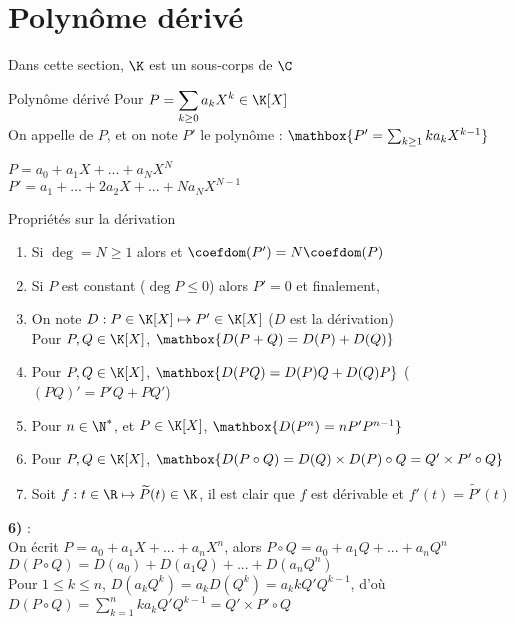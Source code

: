 \documentclass[12pt,a4paper]{report}
\begin{document}
\section{Polynôme dérivé}
Dans cette section, $\K$ est un sous-corps de $\C$

\begin{definition}{Polynôme dérivé}{}
Pour $P = \displaystyle\sum_{k\geq 0} a_k X^k \in \K[X]$\\
On appelle  de $P$, et on note $P'$ le polynôme : $\mathbox{P' = \sum_{k\geq 1} k a_k X^{k-1} }$
\end{definition}

\begin{exemple}
$P=a_0 + a_1 X + ... + a_N X^N$\\
$P'= a_1 + ... + 2a_2 X +... + Na_N X^{N-1}$
\end{exemple}

\begin{propositions}{Propriétés sur la dérivation}{}
\begin{enumerate}
    \item Si $\deg = N \geq 1$ alors  et $\coefdom (P') = N\coefdom (P)$
    \item Si $P$ est constant ($\deg P \leq 0$) alors $P' =0$ et finalement, 
    \item On note $D : P \in \K[X] \mapsto P' \in \K[X]$ ($D$ est la dérivation)\\
    Pour $P,Q \in \K[X]$, $\mathbox{D(P+Q)=D(P)+D(Q)}$
    \item Pour $P,Q \in \K[X]$, $\mathbox{D(PQ)=D(P)Q+D(Q)P}$ ($(PQ)' = P'Q + PQ'$)
    \item Pour $n \in \N^*$, et $P\in \K[X]$, $\mathbox{D(P^n)=nP'P^{n-1}}$
    \item Pour $P,Q \in \K[X]$, $\mathbox{D(P\circ Q)= D(Q) \times D(P) \circ Q = Q' \times P'\circ Q}$
    \item Soit $f : t \in \R \mapsto \widetilde{P}(t) \in \K$, il est clair que $f$ est dérivable et $f'(t) =  \widetilde{P'} (t)$\\
\end{enumerate}
\end{propositions}

\begin{demo}
\textbf{6)} : \\
On écrit $P = a_0 + a_1 X + ... + a_n X^n$, alors $P\circ Q = a_0 + a_1 Q + ... + a_n Q^n$\\
$D(P\circ Q) = D(a_0)+D(a_1 Q) + ...+ D(a_n Q^n)$\\
Pour $1\leq k \leq n$, $D(a_k Q^k) = a_k D(Q^k) = a_k kQ'Q^{k-1}$, d'où $D(P\circ Q) = \displaystyle\sum^n_{k=1} ka_k Q'Q^{k-1} = Q' \times P'\circ Q$
\end{demo}
\end{document}
